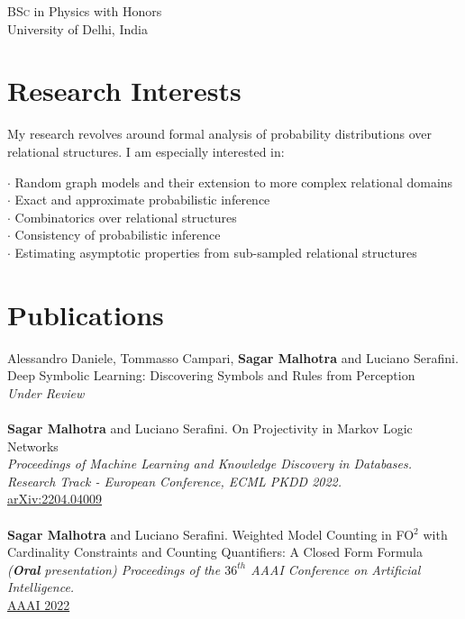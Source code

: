 \documentclass[10pt, a4paper]{article}
\newcommand{\years}[1]{\marginnote{\scriptsize #1}}
\begin{document}
\years{2015-2012}\textsc{BSc} in Physics with Honors\\
University of Delhi, India



\section*{Research Interests}
My research revolves around formal analysis of probability distributions over relational structures. I am especially interested in:

$\cdot$ Random graph models and their extension to more complex relational domains\\
$\cdot$ Exact and approximate probabilistic inference  \\
$\cdot$ Combinatorics over relational structures\\ 
$\cdot$ Consistency of probabilistic inference\\
$\cdot$ Estimating asymptotic properties from sub-sampled relational structures\\


\section*{Publications}

\noindent

\years{2022} Alessandro Daniele, Tommasso Campari, \textbf{Sagar Malhotra} and Luciano Serafini. \\ Deep Symbolic Learning: Discovering Symbols and Rules from Perception \\ \emph{Under Review} \\ \\
\years{2022}\textbf{Sagar Malhotra} and Luciano Serafini. On Projectivity in Markov Logic Networks \\ \emph{Proceedings of Machine Learning and Knowledge Discovery in Databases. Research Track - European Conference, ECML PKDD 2022.} \\
\href{https://arxiv.org/pdf/2204.04009.pdf}{arXiv:2204.04009} \\ \\ 
\years{2022}\textbf{Sagar Malhotra} and Luciano Serafini. Weighted Model Counting in FO$^2$ with Cardinality Constraints and Counting Quantifiers: A Closed Form Formula \\ \emph{(\textbf{Oral} presentation) Proceedings of the $36^{th}$ AAAI Conference on Artificial Intelligence.}\\ \href{https://ojs.aaai.org/index.php/AAAI/article/view/20525}{AAAI 2022} \\
\end{document}
